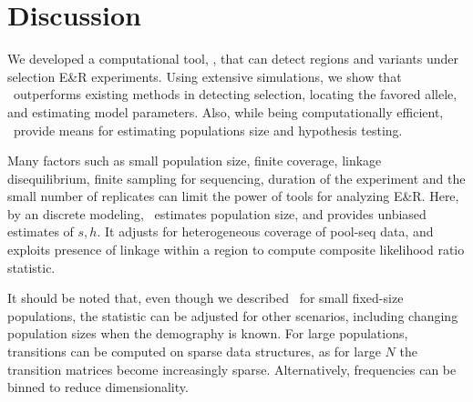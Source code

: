 \section{Discussion}
We developed a computational tool, \comale, that can detect regions
and variants under selection E\&R experiments. Using extensive simulations, 
we show that \comale\
outperforms existing methods in detecting selection, locating the
favored allele, and estimating model parameters.  Also, while
being computationally efficient, \comale\ provide means for estimating
populations size and hypothesis testing.

Many factors such as small population size, finite coverage, linkage
disequilibrium, finite sampling for sequencing, duration of the
experiment and the small number of replicates can limit the power of
tools for analyzing E\&R.  Here, by an discrete modeling, \comale\
estimates population size, and provides unbiased estimates of
$s,h$. It adjusts for heterogeneous coverage of pool-seq data, and
exploits presence of linkage within a region to compute composite
likelihood ratio statistic.


It should be noted that, even though we described \comale\ for small
fixed-size populations, the statistic can be adjusted for other
scenarios, including changing population sizes when the demography is
known. For large populations, transitions can be computed on sparse
data structures, as for large $N$ the transition matrices become
increasingly sparse. Alternatively, frequencies can be binned to
reduce dimensionality.




